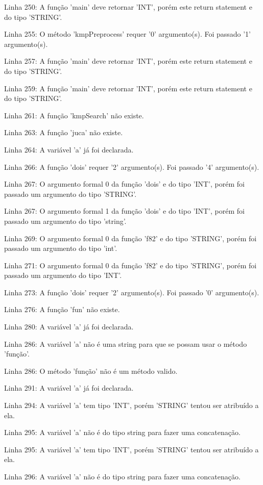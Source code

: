 \documentclass[12pt]{article}
\begin{document}
Linha 250: A função 'main' deve retornar 'INT', porém este return statement e do tipo 'STRING'.

Linha 255: O método 'kmpPreprocess' requer '0' argumento(s). Foi passado '1' argumento(s).

Linha 257: A função 'main' deve retornar 'INT', porém este return statement e do tipo 'STRING'.

Linha 259: A função 'main' deve retornar 'INT', porém este return statement e do tipo 'STRING'.

Linha 261: A função 'kmpSearch' não existe.

Linha 263: A função 'juca' não existe.

Linha 264: A variável 'a' já foi declarada.

Linha 266: A função 'dois' requer '2' argumento(s). Foi passado '4' argumento(s).

Linha 267: O argumento formal 0 da função 'dois' e do tipo 'INT', porém foi passado um argumento do tipo 'STRING'.

Linha 267: O argumento formal 1 da função 'dois' e do tipo 'INT', porém foi passado um argumento do tipo 'string'.

Linha 269: O argumento formal 0 da função 'f82' e do tipo 'STRING', porém foi passado um argumento do tipo 'int'.

Linha 271: O argumento formal 0 da função 'f82' e do tipo 'STRING', porém foi passado um argumento do tipo 'INT'.

Linha 273: A função 'dois' requer '2' argumento(s). Foi passado '0' argumento(s).

Linha 276: A função 'fun' não existe.

Linha 280: A variável 'a' já foi declarada.

Linha 286: A variável 'a' não é uma string para que se possam usar o método 'função'.

Linha 286: O método 'função' não é um método valido.

Linha 291: A variável 'a' já foi declarada.

Linha 294: A variável 'a' tem tipo 'INT', porém 'STRING' tentou ser atribuído a ela.

Linha 295: A variável 'a' não é do tipo string para fazer uma concatenação.

Linha 295: A variável 'a' tem tipo 'INT', porém 'STRING' tentou ser atribuído a ela.

Linha 296: A variável 'a' não é do tipo string para fazer uma concatenação.
\end{document}
